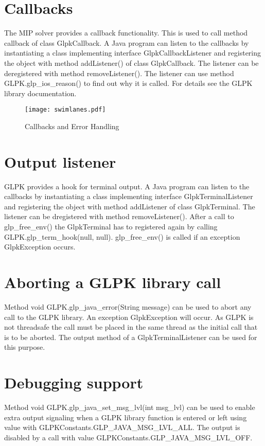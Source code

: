 \documentclass[a4paper,11pt]{report}
\begin{document}
\section{Callbacks}
The MIP solver provides a callback functionality. This is used to call
method callback of class GlpkCallback. A Java program can listen to the
callbacks by instantiating a class implementing interface
GlpkCallbackListener and registering the object with method addListener()
of class GlpkCallback. The listener can be deregistered with method
removeListener(). The listener can use method GLPK.glp\_ios\_reason() to find
out why it is called. For details see the GLPK library documentation.

\begin{landscape}
\begin{figure}[swimlanes]
\caption{Callbacks and Error Handling}
\texttt{[image: swimlanes.pdf]}
\end{figure}
\end{landscape}

\section{Output listener}
GLPK provides a hook for terminal output. A Java program can listen to the
callbacks by instantiating a class implementing interface GlpkTerminalListener
and registering the object with method addListener of class GlpkTerminal.
The listener can be dregistered with method removeListener().
After a call to glp\_free\_env() the GlpkTerminal has to registered again
by calling GLPK.glp\_term\_hook(null, null). glp\_free\_env() is called if
an exception GlpkException occurs.

\section{Aborting a GLPK library call}
Method void GLPK.glp\_java\_error(String message) can be used to abort any call
to the GLPK library. An exception GlpkException will occur. As GLPK is not
threadsafe the call must be placed in the same thread as the initial call that
is to be aborted. The output method of a GlpkTerminalListener can be used
for this purpose.

\section{Debugging support}
Method void GLPK.glp\_java\_set\_msg\_lvl(int msg\_lvl) can be used to enable
extra output signaling when a GLPK library function is entered or left using 
value with GLPKConstants.GLP\_JAVA\_MSG\_LVL\_ALL. The output is disabled by a
call with value GLPKConstants.GLP\_JAVA\_MSG\_LVL\_OFF.
\end{document}
